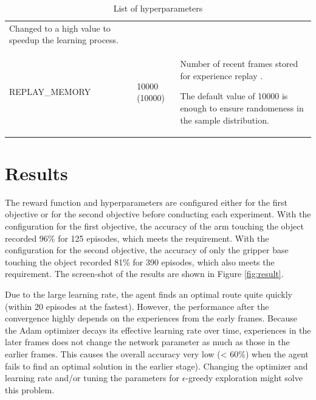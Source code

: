 \documentclass[a4paper]{article}
\begin{document}
\begin{table}[htp]
\begin{tabular}{p{3.5cm}|p{1.5cm}|p{8.5cm}}
Changed to a high value to speedup the learning process. \\
REPLAY\_MEMORY & 10000 (10000) & Number of recent frames stored for experience replay \cite{Zhan2016}.

The default value of 10000 is enough to ensure randomeness in the sample distribution. \\
\end{tabular}
\caption{List of hyperparameters}
\label{tab:hyperparameters}
\end{table}

\section{Results}
The reward function and hyperparameters are configured either for the first objective or for the second objective before conducting each experiment. With the configuration for the first objective, the accuracy of the arm touching the object recorded 96\% for 125 episodes, which meets the requirement. With the configuration for the second objective, the accuracy of only the gripper base touching the object recorded 81\% for 390 episodes, which also meets the requirement. The screen-shot of the results are shown in Figure \ref{fig:result}.

Due to the large learning rate, the agent finds an optimal route quite quickly (within 20 episodes at the fastest). However, the performance after the convergence highly depends on the experiences from the early frames. Because the Adam optimizer decays its effective learning rate over time, experiences in the later frames does not change the network parameter as much as those in the earlier frames. This causes the overall accuracy very low (< 60\%) when the agent fails to find an optimal solution in the earlier stage). Changing the optimizer and learning rate and/or tuning the parameters for \(\epsilon\)-greedy exploration might solve this problem.
\end{document}
